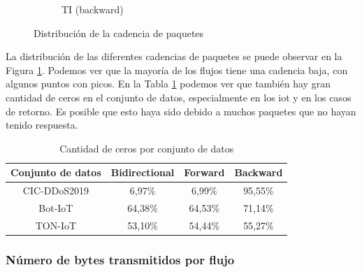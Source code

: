 \begin{figure}[H]
\begin{subfigure}[b]{0.26\textwidth}
        \caption{TI (backward)}
    \end{subfigure}
    \hfill
       \caption{Distribución de la cadencia de paquetes}
       \label{fig:packet_pincer_packet_second}
\end{figure}

La distribución de las diferentes cadencias de paquetes se puede observar en la Figura \ref{fig:packet_pincer_packet_second}. Podemos ver que la mayoría de los flujos tiene una cadencia baja, con algunos puntos con picos. En la Tabla \ref{table:packet_pincer_packet_second_zeroes} podemos ver que también hay gran cantidad de ceros en el conjunto de datos, especialmente en los \acrshort{iot} y en los casos de retorno. Es posible que esto haya sido debido a muchos paquetes que no hayan tenido respuesta.

\begin{table}[H]
    \centering
    \begin{tabular}{|c | c c c |}
        \hline
        \textbf{Conjunto de datos} & \textbf{Bidirectional} & \textbf{Forward} & \textbf{Backward} \\ \hline
        CIC-DDoS2019               & 6,97\%                 & 6,99\%           & 95,55\% \\
        Bot-IoT                    & 64,38\%                & 64,53\%          & 71,14\% \\
        TON-IoT                    & 53,10\%                & 54,44\%          & 55,27\% \\
        \hline
    \end{tabular}
    \caption{Cantidad de ceros por conjunto de datos}
    \label{table:packet_pincer_packet_second_zeroes}
\end{table}

\subsubsection{Número de bytes transmitidos por flujo}

